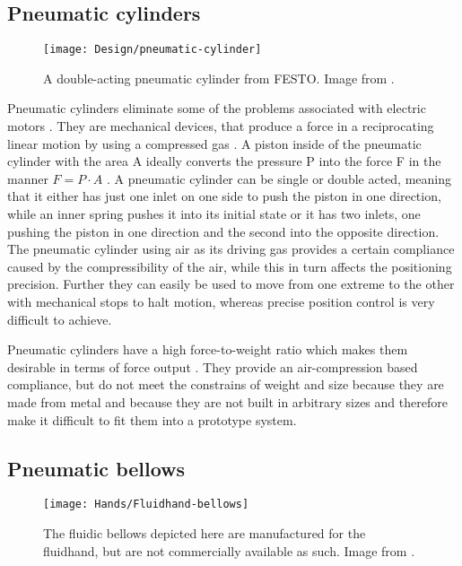 \documentclass[main]{subfiles}
\begin{document}
\subsection{Pneumatic cylinders}

\begin{figure}[H]
\centering
\texttt{[image: Design/pneumatic-cylinder]}
\caption[A double-acting pneumatic cylinder]{A double-acting pneumatic cylinder from FESTO. Image from \cite{cylinder}.}
\label{pneumatic-cylinder}
\end{figure}

Pneumatic cylinders eliminate some of the problems associated with electric motors \cite{Song1989}. They are mechanical devices, that produce a force in a reciprocating linear motion by using a compressed gas \cite{Majumdar1995}. A piston inside of the pneumatic cylinder with the area A ideally converts the pressure P into the force F in the manner $F= P \cdot A$ \cite{Majumdar1995}. A pneumatic cylinder can be single or double acted, meaning that it either has just one inlet on one side to push the piston in one direction, while an inner spring pushes it into its initial state or it has two inlets, one pushing the piston in one direction and the second into the opposite direction. The pneumatic cylinder using air as its driving gas provides a certain compliance caused by the compressibility of the air, while this in turn affects the positioning precision. Further they can easily be used to move from one extreme to the other with mechanical stops to halt motion, whereas precise position control is very difficult to achieve.

Pneumatic cylinders have a high force-to-weight ratio which makes them desirable in terms of force output \cite{Hollerbach1992}. They provide an air-compression based compliance, but do not meet the constrains of weight and size because they are made from metal and because they are not built in arbitrary sizes and therefore make it difficult to fit them into a prototype system.


\subsection{Pneumatic bellows}

\begin{figure}[H]
\centering
\texttt{[image: Hands/Fluidhand-bellows]}
\caption[Fluidic bellows]{The fluidic bellows depicted here are manufactured for the fluidhand, but are not commercially available as such. Image from \cite{Gaiser2009}.}
\label{Fluidic-bellow}
\end{figure}
\end{document}
